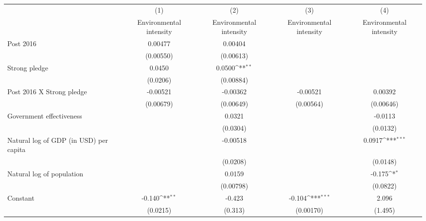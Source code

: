 {
\def\sym#1{\ifmmode^{#1}\else\(^{#1}\)\fi}
\begin{tabular}{l*{4}{c}}
\hline\hline
                    &\multicolumn{1}{c}{(1)}&\multicolumn{1}{c}{(2)}&\multicolumn{1}{c}{(3)}&\multicolumn{1}{c}{(4)}\\
                    &\multicolumn{1}{c}{Environmental intensity}&\multicolumn{1}{c}{Environmental intensity}&\multicolumn{1}{c}{Environmental intensity}&\multicolumn{1}{c}{Environmental intensity}\\
\hline
Post 2016           &     0.00477         &     0.00404         &                     &                     \\
                    &   (0.00550)         &   (0.00613)         &                     &                     \\
[1em]
Strong pledge       &      0.0450         &      0.0500\sym{**} &                     &                     \\
                    &    (0.0206)         &   (0.00884)         &                     &                     \\
[1em]
Post 2016 X Strong pledge&    -0.00521         &    -0.00362         &    -0.00521         &     0.00392         \\
                    &   (0.00679)         &   (0.00649)         &   (0.00564)         &   (0.00646)         \\
[1em]
Government effectiveness&                     &      0.0321         &                     &     -0.0113         \\
                    &                     &    (0.0304)         &                     &    (0.0132)         \\
[1em]
Natural log of GDP (in USD) per capita&                     &    -0.00518         &                     &      0.0917\sym{***}\\
                    &                     &    (0.0208)         &                     &    (0.0148)         \\
[1em]
Natural log of population&                     &      0.0159         &                     &      -0.175\sym{*}  \\
                    &                     &   (0.00798)         &                     &    (0.0822)         \\
[1em]
Constant            &      -0.140\sym{**} &      -0.423         &      -0.104\sym{***}&       2.096         \\
                    &    (0.0215)         &     (0.313)         &   (0.00170)         &     (1.495)         \\

\end{tabular}}
